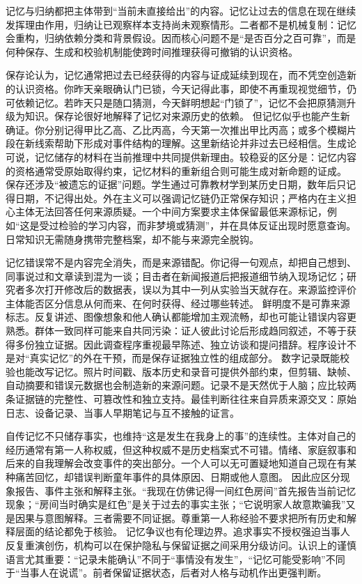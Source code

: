 记忆与归纳都把主体带到“当前未直接给出”的内容。记忆让过去的信息在现在继续发挥理由作用，归纳让已观察样本支持尚未观察情形。二者都不是机械复制：记忆会重构，归纳依赖分类和背景假设。因而核心问题不是“是否百分之百可靠”，而是何种保存、生成和校验机制能使跨时间推理获得可撤销的认识资格。

保存论认为，记忆通常把过去已经获得的内容与证成延续到现在，而不凭空创造新的认识资格。你昨天亲眼确认门已锁，今天记得此事，即使不再重现视觉细节，仍可依赖记忆。若昨天只是随口猜测，今天鲜明想起“门锁了”，记忆不会把原猜测升级为知识。保存论很好地解释了记忆对来源历史的依赖。 但记忆似乎也能产生新确证。你分别记得甲比乙高、乙比丙高，今天第一次推出甲比丙高；或多个模糊片段在新线索帮助下形成对事件结构的理解。这里新结论并非过去已经相信。生成论可说，记忆储存的材料在当前推理中共同提供新理由。较稳妥的区分是：记忆内容的资格通常受原始取得约束，记忆材料的重新组合则可能生成对新命题的证成。 保存还涉及“被遗忘的证据”问题。学生通过可靠教材学到某历史日期，数年后只记得日期，不记得出处。外在主义可以强调记忆链仍正常保存知识；严格内在主义担心主体无法回答任何来源质疑。一个中间方案要求主体保留最低来源标记，例如“这是受过检验的学习内容，而非梦境或猜测”，并在具体反证出现时愿意查询。日常知识无需随身携带完整档案，却不能与来源完全脱钩。

记忆错误常不是内容完全消失，而是来源错配。你记得一句观点，却把自己想到、同事说过和文章读到混为一谈；目击者在新闻报道后把报道细节纳入现场记忆；研究者多次打开修改后的数据表，误以为其中一列从实验当天就存在。来源监控评价主体能否区分信息从何而来、在何时获得、经过哪些转述。 鲜明度不是可靠来源标志。反复讲述、图像想象和他人确认都能增加主观流畅，却也可能让错误内容更熟悉。群体一致同样可能来自共同污染：证人彼此讨论后形成趋同叙述，不等于获得多份独立证据。因此调查程序重视最早陈述、独立访谈和提问措辞。程序设计不是对“真实记忆”的外在干预，而是保存证据独立性的组成部分。 数字记录既能校验也能改写记忆。照片时间戳、版本历史和录音可提供外部约束，但剪辑、缺帧、自动摘要和错误元数据也会制造新的来源问题。记录不是天然优于人脑；应比较两条证据链的完整性、可篡改性和独立支持。最佳判断往往来自异质来源交叉：原始日志、设备记录、当事人早期笔记与互不接触的证言。

自传记忆不只储存事实，也维持“这是发生在我身上的事”的连续性。主体对自己的经历通常有第一人称权威，但这种权威不是历史档案式不可错。情绪、家庭叙事和后来的自我理解会改变事件的突出部分。一个人可以无可置疑地知道自己现在有某种痛苦回忆，却错误判断童年事件的具体原因、日期或他人意图。 因此应区分现象报告、事件主张和解释主张。“我现在仿佛记得一间红色房间”首先报告当前记忆现象；“房间当时确实是红色”是关于过去的事实主张；“它说明家人故意欺骗我”又是因果与意图解释。三者需要不同证据。尊重第一人称经验不要求把所有历史和解释层面的结论都免于核验。 记忆争议也有伦理边界。追求事实不授权强迫当事人反复重演创伤，机构可以在保护隐私与保留证据之间采用分级访问。认识上的谨慎语言尤其重要：“记录未能确认”不同于“事情没有发生”，“记忆可能受影响”不同于“当事人在说谎”。前者保留证据状态，后者对人格与动机作出更强判断。

